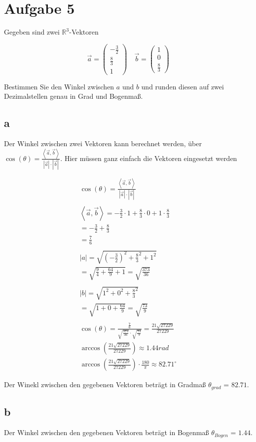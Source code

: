 \section{Aufgabe 5}

Gegeben sind zwei $\mathbb{R}^3$-Vektoren

\[
\vec{a} = \begin{pmatrix}
    -\frac{3}{2} \\
    \frac{8}{3} \\
    1
\end{pmatrix} \quad \vec{b} = \begin{pmatrix}
    1 \\ 0 \\ \frac{8}{3}
\end{pmatrix}
\]

Bestimmen Sie den Winkel zwischen $a$ und $b$ und runden diesen auf zwei Dezimalstellen genau in Grad und Bogenmaß.

\subsection{a}

Der Winkel zwischen zwei Vektoren kann berechnet werden, über $\cos(\theta) = \frac{\left\langle \vec{a}, \vec{b} \right\rangle}{\left|\vec{a}\right| \cdot \left|\vec{b}\right|}$. Hier müssen ganz einfach die Vektoren eingesetzt werden

\begin{align*}
    \cos(\theta) = \frac{\left\langle \vec{a}, \vec{b} \right\rangle}{\left|\vec{a}\right| \cdot \left|\vec{b}\right|} \\\\
    \left\langle \vec{a}, \vec{b} \right\rangle = -\frac{3}{2} \cdot 1 + \frac{8}{3} \cdot 0 + 1 \cdot \frac{8}{3} \\
    = -\frac{3}{2} + \frac{8}{3} \\
    = \frac{7}{6} \\\\
    \left|a\right| = \sqrt{{(-\frac{3}{2})}^2 + \frac{8}{3}^2 + 1^2} \\
    = \sqrt{{\frac{9}{4}} + \frac{64}{9} + 1}
    = \sqrt{\frac{373}{36}} \\\\
    \left|b\right| = \sqrt{1^2 + 0^2 + \frac{8}{3}^2} \\
    = \sqrt{1 + 0 + \frac{64}{9}}
    = \sqrt{\frac{73}{9}} \\\\
    \cos(\theta) = \frac{\frac{7}{6}}{\sqrt{\frac{373}{36}} \cdot \sqrt{\frac{73}{9}}} = \frac{21 \sqrt{27229}}{27229} \\
    \arccos\left(\frac{21 \sqrt{27229}}{27229}\right) \approx 1.44 rad \\
    \arccos\left(\frac{21 \sqrt{27229}}{27229}\right) \cdot \frac{180}{\pi} \approx 82.71^\circ
\end{align*}

Der Winekl zwischen den gegebenen Vektoren beträgt in Gradmaß $\theta_{grad}$ = $82.71$.

\subsection{b}

Der Winkel zwischen den gegebenen Vektoren beträgt in Bogenmaß $\theta_{Bogen}$ = $1.44$.